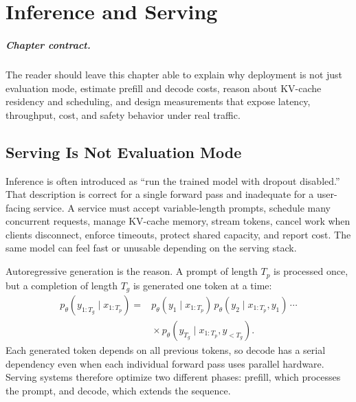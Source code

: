 \chapter{Inference and Serving}
\label{ch:inference-serving}


\paragraph{Chapter contract.} The reader should leave this chapter able to explain why deployment is not just evaluation mode, estimate prefill and decode costs, reason about KV-cache residency and scheduling, and design measurements that expose latency, throughput, cost, and safety behavior under real traffic.

\section{Serving Is Not Evaluation Mode}
\label{sec:serving-not-eval-mode}

Inference is often introduced as ``run the trained model with dropout disabled.'' That description is correct for a single forward pass and inadequate for a user-facing service. A \llm service must accept variable-length prompts, schedule many concurrent requests, manage KV-cache memory, stream tokens, cancel work when clients disconnect, enforce timeouts, protect shared capacity, and report cost. The same model can feel fast or unusable depending on the serving stack.

Autoregressive generation is the reason. A prompt of length $T_p$ is processed once, but a completion of length $T_g$ is generated one token at a time:
\begin{equation}
  \begin{aligned}
  p_{\theta}(y_{1:T_g}\mid x_{1:T_p}) ={}&
  p_{\theta}(y_1\mid x_{1:T_p})\,
  p_{\theta}(y_2\mid x_{1:T_p}, y_1)\,\cdots \\
  &{}\times p_{\theta}(y_{T_g}\mid x_{1:T_p}, y_{<T_g}).
  \end{aligned}
\end{equation}
Each generated token depends on all previous tokens, so decode has a serial dependency even when each individual forward pass uses parallel hardware. Serving systems therefore optimize two different phases: prefill, which processes the prompt, and decode, which extends the sequence.

